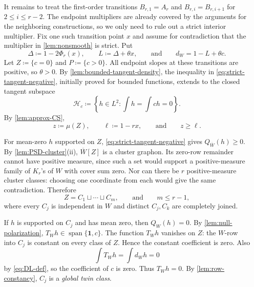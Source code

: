 \documentclass[10pt]{article}
\numberwithin{equation}{section}
\newcommand{\one}{\mathbf 1}
\begin{document}
\label{sec:defects}
It remains to treat the first-order transitions $B_{r,1}=A_r$ and $B_{r,i}=B_{r,i+1}$ for $2\le i\le r-2$.  The endpoint multipliers are already covered by the arguments for the neighboring constructions, so we only need to rule out a strict interior multiplier.  Fix one such transition point $x$ and assume for contradiction that the multiplier in \cref{lem:nonsmooth} is strict.  Put
\begin{equation}\label{eq:DL-def}
 \Delta\coloneqq1-2\Phi_r(x),
 \qquad
 L\coloneqq\Delta+\theta x,
 \qquad\text{and}\qquad
 d_W=1-L+\theta c.
\end{equation}
Let $Z\coloneqq\{c=0\}$ and $P\coloneqq\{c>0\}$.  All endpoint slopes at these transitions are positive, so $\theta>0$.  By \cref{lem:bounded-tangent-density}, the inequality in \cref{eq:strict-tangent-negative}, initially proved for bounded functions, extends to the closed tangent subspace
\[
 \mathcal H_c\coloneqq\left\{h\in L^2\colon \int h=\int ch=0\right\}.
\]
By \cref{lem:approx-CS},
\begin{equation}\label{eq:z-lower}
 z\coloneqq\mu(Z),
 \qquad
 \ell\coloneqq1-rx,
 \qquad\text{and}\qquad
 z\ge\ell.
\end{equation}

For mean-zero $h$ supported on $Z$, \cref{eq:strict-tangent-negative} gives $Q_{\overline W}(h)\ge0$.  By \cref{lem:PSD-cluster}(ii), $\overline W[Z]$ is a cluster graphon.  Its zero-row remainder cannot have positive measure, since such a set would support a positive-measure family of $K_r$'s of $W$ with cover sum zero.  Nor can there be $r$ positive-measure cluster classes: choosing one coordinate from each would give the same contradiction.  Therefore
\[
 Z=C_1\sqcup\cdots\sqcup C_m,
 \qquad\text{and}\qquad m\le r-1,
\]
where every $C_j$ is independent in $W$ and distinct $C_j,C_k$ are completely joined.

If $h$ is supported on $C_j$ and has mean zero, then $Q_W(h)=0$.  By \cref{lem:null-polarization}, $T_Wh\in\operatorname{span}\{\one,c\}$.  The function $T_Wh$ vanishes on $Z$: the $W$-row into $C_j$ is constant on every class of $Z$.  Hence the constant coefficient is zero.  Also
\[
 \int T_Wh=\int d_Wh=0
\]
by \cref{eq:DL-def}, so the coefficient of $c$ is zero.  Thus $T_Wh=0$.  By \cref{lem:row-constancy}, $C_j$ is a \emph{global twin class}.
\end{document}
